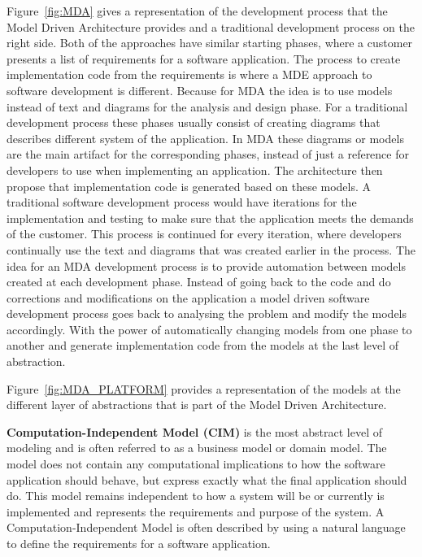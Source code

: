 Figure~\ref{fig:MDA} gives a representation of the development process that the
Model Driven Architecture provides and a traditional development process on the
right side.
Both of the approaches have similar starting phases, where a customer presents a
list of requirements for a software application. The process to create
implementation code from the requirements is where a MDE approach to software
development is different. Because for MDA the idea is to use models instead of
text and diagrams for the analysis and design phase. For a traditional
development process these phases usually consist of creating diagrams that
describes different system of the application. In MDA these diagrams or models
are the main artifact for the corresponding phases, instead of just a reference for
developers to use when implementing an application. The architecture then
propose that implementation code is generated based on these models. A
traditional software development process would have iterations for the
implementation and testing to make sure that the application meets the demands
of the customer. This process is continued for every iteration, where
developers continually use the text and diagrams that was created earlier in
the process. The idea for an MDA development process is to provide automation
between models created at each development phase. Instead of going back to the
code and do corrections and modifications on the application a model driven
software development process goes back to analysing the problem and modify the
models accordingly. With the power of automatically changing models from one
phase to another and generate implementation code from the models at the last
level of abstraction.

Figure~\ref{fig:MDA_PLATFORM} provides a representation of the models at the
different layer of abstractions that is part of the Model Driven Architecture. 

\textbf{Computation-Independent Model (CIM)} is the most abstract level of
modeling and is often referred to as a business model or domain model. The
model does not contain any computational implications to how the software
application should behave, but express exactly what the final application
should do. This model remains independent to how a system will be or currently
is implemented and represents the requirements and purpose of the system. A
Computation-Independent Model is often described by using a natural language to
define the requirements for a software application. 

